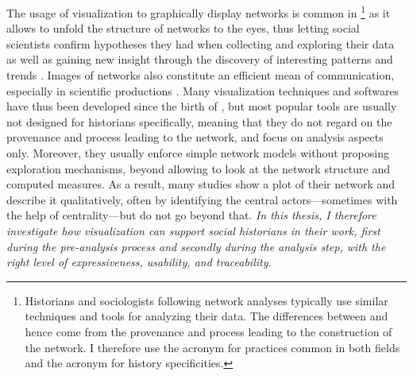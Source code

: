 The usage of visualization to graphically display networks is common in \sna\footnote{Historians and sociologists following network analyses typically use similar techniques and tools for analyzing their data. The differences between \sna and \hsna hence come from the provenance and process leading to the construction of the network. I therefore use the \sna acronym for practices common in both fields and the \hsna acronym for history specificities.} as it allows to unfold the structure of networks to the eyes, thus letting social scientists confirm hypotheses they had when collecting and exploring their data as well as gaining new insight through the discovery of interesting patterns and trends \cite{cristofoliPrincipesUsagesDessins}.
Images of networks also constitute an efficient mean of communication, especially in scientific productions \cite{freemanVisualizingSocialNetworks2000}.
Many visualization techniques and softwares have thus been developed since the birth of \sna, but most popular tools are usually not designed for historians specifically, meaning that they do not regard on the provenance and process leading to the network, and focus on analysis aspects only.
Moreover, they usually enforce simple network models without proposing exploration mechanisms, beyond allowing to look at the network structure and computed measures.
As a result, many \hsna studies show a plot of their network and describe it qualitatively, often by identifying the central actors---sometimes with the help of centrality---but do not go beyond that\cite{lemercierQuantitativeMethodsHumanities2019}.
\emph{In this thesis, I therefore investigate how visualization can support social historians in their work, first during the pre-analysis process and secondly during the analysis step, with the right level of expressiveness, usability, and traceability.}







